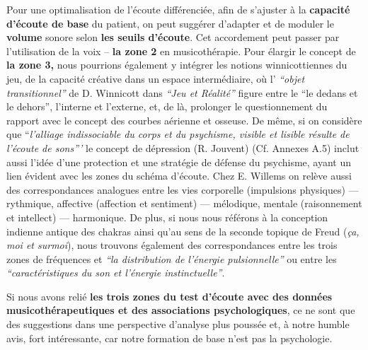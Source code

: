 Pour une optimalisation de l'écoute différenciée, afin de s'ajuster à la \textbf{capacité d'écoute de base} 
du patient, on peut suggérer d'adapter et de moduler le \textbf{volume} sonore selon \textbf{ les seuils 
d'écoute}. Cet accordement peut passer par 
l'utilisation 
de la voix -- \textbf{ la zone 2} en musicothérapie.
Pour élargir le concept de \textbf{la zone 3,} nous pourrions
également y intégrer les notions winnicottiennes du jeu, de la capacité
créative dans un espace
intermédiaire, où l' \textit{``objet
	transitionnel'' } de D. Winnicott dans \textit{``Jeu et Réalité''}
\autocite{winnicott}
figure entre le ``le
dedans et le
dehors'',
l'interne et l'externe, et, de là, prolonger le questionnement du
rapport avec le concept des
courbes aérienne et osseuse.
De même, si on considère que ``\emph{l'alliage indissociable du corps et du psychisme,
	visible et lisible résulte de l'écoute de
	sons'''}\autocite{tomatis_conf1972}
	 le concept de dépression (R. Jouvent) \autocite{doronparot} (Cf. Annexes
A.5) inclut aussi l'idée d'une protection et une stratégie de
défense du psychisme, ayant un lien évident avec les zones du schéma d'écoute.
Chez E. Willems \autocite{willems} 
on relève aussi des correspondances 
	analogues entre les vies
corporelle (impulsions physiques)
--- rythmique, affective (affection et sentiment) --- mélodique, mentale
(raisonnement et intellect) --- harmonique.
     De plus, si nous nous référons à la conception indienne antique des chakras
ainsi qu'au sens de la seconde
topique de Freud (\textit{ça, moi et surmoi}), nous trouvons également des correspondances
entre les trois zones de
fréquences et \textit {``la distribution de l'énergie pulsionnelle''} ou entre
les
\textit{``caractéristiques du son et l'énergie
	instinctuelle''}\autocite[ch. 13]{auriol_cle_1996}.


Si nous avons relié\textbf{ les trois zones du
	test d'écoute avec des données musicothérapeutiques et des associations psychologiques}, ce ne 
	sont que des suggestions dans une perspective d'analyse 
plus
poussée et, à notre humble avis, fort intéressante, car notre formation de base n'est pas la psychologie.

